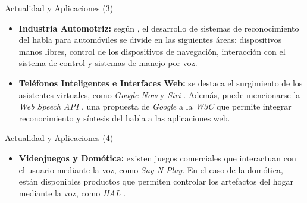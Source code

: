 \begin{frame}{Actualidad y Aplicaciones (3)}
\begin{itemize}
	\item{\textbf{Industria Automotriz:}}
	seg\'un \cite{Kirriemuir2003Speech}, el desarrollo de sistemas de reconocimiento del habla para autom\'oviles
	se divide en las siguientes \'areas: dispositivos manos libres, control
	de los dispositivos de navegaci\'on, interacci\'on con el sistema de control y sistemas de manejo por voz.

	\item{\textbf{Tel\'efonos Inteligentes e Interfaces Web:}}
	se destaca el surgimiento de los asistentes virtuales,
	como \emph{Google Now} \cite{GoogleNow} y \emph{Siri} \cite{AppleSiri}. Adem\'as,
	puede mencionarse la \emph{Web Speech API} \cite{GoogleWebSpeechAPI}, una propuesta de \emph{Google}
	a la \emph{W3C} que permite integrar reconocimiento y s\'intesis del habla a las aplicaciones web.
\end{itemize}
\end{frame}
\begin{frame}{Actualidad y Aplicaciones (4)}
\begin{itemize}
	\item{\textbf{Videojuegos y Dom\'otica:}}
	existen juegos comerciales que interactuan con el usuario
	mediante la voz, como \emph{Say-N-Play}\cite{SayNPlay}. En el caso de la dom\'otica, 
	est\'an disponibles productos que permiten controlar los artefactos del hogar mediante la voz, 
	como \emph{HAL} \cite{HAL}.
\end{itemize}
\end{frame}
